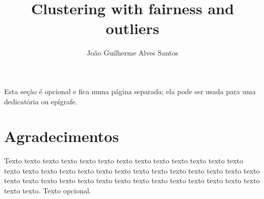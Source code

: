 \documentclass[a4paper,12pt,twoside,brazilian,english]{book}
\title{Clustering with fairness and outliers}
\author{João Guilherme Alves Santos}
\begin{document}

\frontmatter

\pagestyle{plain}

\onehalfspacing %

\maketitle %


\begin{dedicatoria}
Esta seção é opcional e fica numa página separada; ela pode ser usada para
uma dedicatória ou epígrafe.
\end{dedicatoria}


\chapter*{Agradecimentos}

Texto texto texto texto texto texto texto texto texto texto texto texto texto
texto texto texto texto texto texto texto texto texto texto texto texto texto
texto texto texto texto texto texto texto texto texto texto texto texto texto
texto texto texto texto. Texto opcional.




\end{document}
